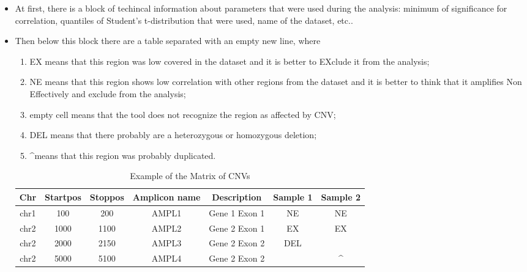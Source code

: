 \documentclass{article}
\begin{document}
\begin{itemize}
\item At first, there is a block of techincal information about parameters that were used during the analysis: minimum of significance for correlation, quantiles of Student's t-distribution that were used, name of the dataset, etc..
\item Then below this block there are a table  separated with an empty new line, where 
\begin{enumerate}
\item EX means that this region was low covered in the dataset and it is better to EXclude it from the analysis;
\item NE means that this region shows low correlation with other regions from the dataset and it is better to think that it amplifies Non Effectively and exclude from the analysis;
\item empty cell means that the tool does not recognize the region as affected by CNV;
\item DEL means that there probably are a heterozygous or homozygous deletion;
\item \textasciicircum means that this region was probably duplicated.
\end{enumerate}
\begin{table}[h]
\centering
\caption{Example of the Matrix of CNVs}
\label{matrixOfCNVs}
\begin{tabular}{|c|c|c|c|c|c|c|}
\hline
Chr  & Startpos & Stoppos & Amplicon name & Description   & Sample 1 & Sample 2          \\ \hline
chr1 & 100      & 200     & AMPL1         & Gene 1 Exon 1 & NE       & NE                \\ \hline
chr2 & 1000     & 1100    & AMPL2         & Gene 2 Exon 1 & EX       & EX                \\ \hline
chr2 & 2000     & 2150    & AMPL3         & Gene 2 Exon 2 & DEL      &                   \\ \hline
chr2 & 5000     & 5100    & AMPL4         & Gene 2 Exon 2 &          & \textasciicircum  \\ \hline
\end{tabular}
\end{table}

\end{itemize} 








\newpage
\end{document}
